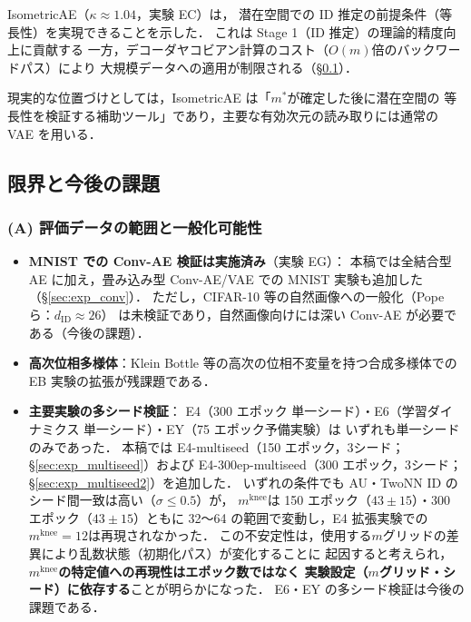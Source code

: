 \documentclass[11pt,a4paper]{jsarticle}
\newcommand{\dzopt}{m^*}
\newcommand{\kap}{\kappa}
\newcommand{\mknee}{m^{\mathrm{knee}}}
\begin{document}
IsometricAE（$\kap \approx 1.04$，実験 EC）は，
潜在空間での ID 推定の前提条件（等長性）を実現できることを示した．
これは Stage 1（ID 推定）の理論的精度向上に貢献する
一方，デコーダヤコビアン計算のコスト（$O(m)$倍のバックワードパス）により
大規模データへの適用が制限される（§\ref{sec:disc_limitation}）．

現実的な位置づけとしては，IsometricAE は「$\dzopt$が確定した後に潜在空間の
等長性を検証する補助ツール」であり，主要な有効次元の読み取りには通常の VAE を用いる．

\subsection{限界と今後の課題}\label{sec:disc_limitation}

\subsubsection*{(A) 評価データの範囲と一般化可能性}

\begin{itemize}
  \item \textbf{MNIST での Conv-AE 検証は実施済み}（実験 EG）：
        本稿では全結合型 AE に加え，畳み込み型 Conv-AE/VAE での MNIST 実験も追加した（§\ref{sec:exp_conv}）．
        ただし，CIFAR-10 等の自然画像への一般化（Pope ら\cite{pope2021intrinsic}：$d_\mathrm{ID} \approx 26$）
        は未検証であり，自然画像向けには深い Conv-AE が必要である（今後の課題）．
  \item \textbf{高次位相多様体}：Klein Bottle 等の高次の位相不変量を持つ合成多様体での
        EB 実験の拡張が残課題である．
  \item \textbf{主要実験の多シード検証}：
        E4（300 エポック 単一シード）・E6（学習ダイナミクス 単一シード）・EY（75 エポック予備実験）は
        いずれも単一シードのみであった．
        本稿では E4-multiseed（150 エポック，3シード；§\ref{sec:exp_multiseed}）および
        E4-300ep-multiseed（300 エポック，3シード；§\ref{sec:exp_multiseed2}）を追加した．
        いずれの条件でも AU・TwoNN ID のシード間一致は高い（$\sigma \leq 0.5$）が，
        $\mknee$は 150 エポック（$43 \pm 15$）・300 エポック（$43 \pm 15$）ともに
        32〜64 の範囲で変動し，E4 拡張実験での$\mknee = 12$は再現されなかった．
        この不安定性は，使用する$m$グリッドの差異により乱数状態（初期化パス）が変化することに
        起因すると考えられ，\textbf{$\mknee$の特定値への再現性はエポック数ではなく
        実験設定（$m$グリッド・シード）に依存する}ことが明らかになった．
        E6・EY の多シード検証は今後の課題である．
\end{itemize}
\end{document}
